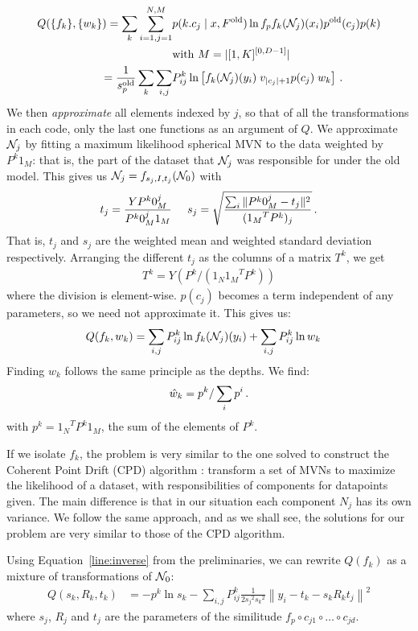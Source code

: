 \documentclass[10pt,a4paper,oneside]{article}
\theoremstyle{definition}
\newcommand{\p}{\mbox{\,.}}
\newcommand{\cN}{{\cal N}}
\theoremstyle{definition}
\begin{document}
\begin{align*}
Q(\{f_k\}, \{w_k\}) = \sum_k \sum_{i=1,j=1}^{N, M} & p(k.c_j \mid x, F^\text{old}) \ln f_p f_k(\cN_{j})(x_i) p^{\text{old}}(c_j) p(k)\\ & \hfill \text{with } M = |[1,K]^{[0, D-1]}|  \\
= \frac{1}{s^\text{old}_p}\sum_k \sum_{i, j} &P^k_{ij} \ln \left[ f_k(\cN_{j})(y_i) \; v_{|c_j|+1} p(c_j) \; w_k \right]\p
\end{align*}
We then \emph{approximate} all elements indexed by $j$, so that of all the transformations in each code, only the last one functions as an argument of $Q$. We approximate $\cN_j$ by fitting a maximum likelihood spherical MVN to the data weighted by $P^k1_M$: that is, the part of the dataset that $\cN_j$ was responsible for under the old model. This gives us $\cN_j = f_{s_j, I, t_j}(\cN_0)$ with
\[
t_j = \frac{YP^k0_M^j}{P^k0_M^j 1_M} \;\;\;\;\; s_j = \sqrt{\frac{\sum_i \|P^k0_M^j - t_j\|^2 }{({1_M}^TP^k)_j}} \p
\]
That is, $t_j$ and $s_j$ are the weighted mean and weighted standard deviation respectively. Arranging the different $t_j$ as the columns of a matrix $T^k$, we get 
\begin{align}
T^k = Y(P^k / (1_N{1_M}^TP^k)) \label{line:tk}
\end{align}
where the division is element-wise. $p(c_j)$ becomes a term independent of any parameters, so we need not approximate it. This gives us:
\begin{align*}
Q(f_k, w_k) &= \sum_{i, j} P^k_{ij} \ln f_k(\cN_j)(y_i) + \sum_{i, j} P^k_{ij} \ln w_k  
\end{align*}
Finding $w_k$ follows the same principle as the depths. We find:
\[
\hat w_k = p^k / \sum_{i} p^i \p
\]
with $p^k = {1_N}^TP^k1_M$, the sum of the elements of $P^k$.

If we isolate $f_k$, the problem is very similar to the one solved to construct the Coherent Point Drift (CPD) algorithm \cite{myronenko2010point}: transform a set of MVNs to maximize the likelihood of a dataset, with responsibilities of components for datapoints given. The main difference is that in our situation each component $N_j$ has its own variance. We follow the same approach, and as we shall see, the solutions for our problem are very similar to those of the CPD algorithm.

Using Equation~\ref{line:inverse} from the preliminaries, we can rewrite $Q(f_k)$ as a mixture of transformations of $\cN_0$:
\begin{align*} 
Q(s_k, R_k, t_k) &= - p^k\ln s_k - \sum_{i, j} P^k_{ij} \frac{1}{2{s_j}^2{s_k}^2} \left\|y_i-t_k - s_k R_k t_j \right\|^2 
\end{align*}
where $s_j$, $R_j$ and $t_j$ are the parameters of the similitude $f_p \circ c_{j1} \circ \ldots \circ c_{jd}$. 
\end{document}
